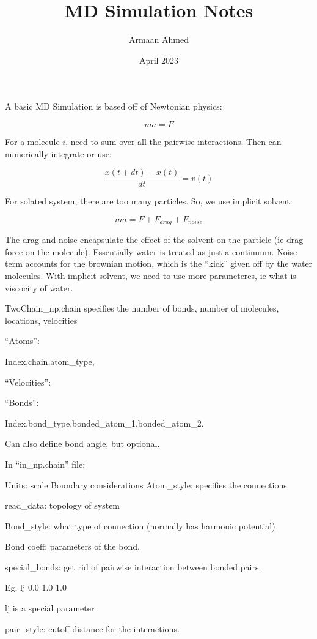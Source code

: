\documentclass{article}
\title{MD Simulation Notes}
\author{Armaan Ahmed}
\date{April 2023}
\begin{document}
\maketitle

A basic MD Simulation is based off of Newtonian physics:

\[ma=F\]

For a molecule $i$, need to sum over all the pairwise interactions. Then can numerically integrate or use:

\[\frac{x(t+dt)-x(t)}{dt} = v(t)\]

For solated system, there are too many particles. So, we use implicit solvent:

\[ma=F+F_{drag}+F_{noise}\]

The drag and noise encapsulate the effect of the solvent on the particle (ie drag force on the molecule). Essentially water is treated as just a continuum. Noise term accounts for the brownian motion, which is the ``kick'' given off by the water molecules. With implicit solvent, we need to use more parameteres, ie what is viscocity of water.

TwoChain\_np.chain specifies the number of bonds, number of molecules, locations, velocities

``Atoms'':

Index,chain,atom\_type,

``Velocities'':

``Bonds'':

Index,bond\_type,bonded\_atom\_1,bonded\_atom\_2.

Can also define bond angle, but optional.

In ``in\_np.chain'' file:

Units: scale
Boundary considerations
Atom\_style: specifies the connections

read\_data: topology of system

Bond\_style: what type of connection (normally has harmonic potential)

Bond coeff: parameters of the bond.

special\_bonds: get rid of pairwise interaction between bonded pairs.

Eg, lj 0.0 1.0 1.0

lj is a special parameter

pair\_style: cutoff distance for the interactions.
\end{document}
